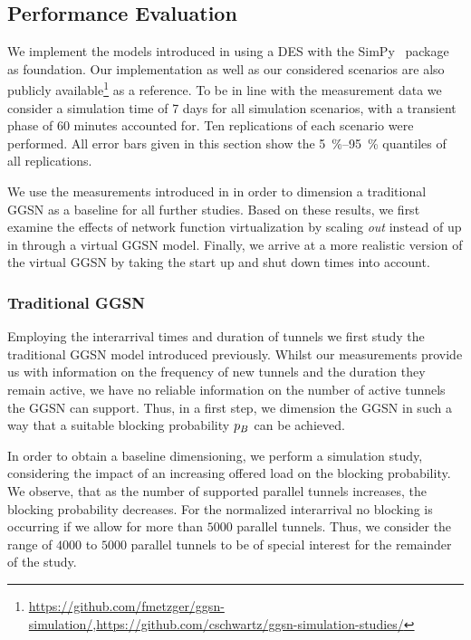 \subsection{Performance Evaluation}\label{sec:cloud:virtualized_network_functions:performance_evaluation}

We implement the models introduced in  using a \gls{DES} with the SimPy~\cite{SimPy2015} package as foundation. Our implementation as well as our considered scenarios are also publicly available\footnote{\url{https://github.com/fmetzger/ggsn-simulation/},\url{https://github.com/cschwartz/ggsn-simulation-studies/}} as a reference.
To be in line with the measurement data we consider a simulation time of 7 days for all simulation scenarios, with a transient phase of 60 minutes accounted for.
Ten replications of each scenario were performed.
All error bars given in this section show the \SIrange{5}{95}{\percent} quantiles of all replications.

We use the measurements introduced in  in order to dimension a traditional \gls{GGSN} as a baseline for all further studies.
Based on these results, we first examine the effects of network function virtualization by scaling \emph{out} instead of up in through a virtual \gls{GGSN} model.
Finally, we arrive at a more realistic version of the virtual \gls{GGSN} by taking the start up and shut down times into account.

\subsubsection*{Traditional GGSN}\label{sec:cloud:virtualized_network_functions:performance_evaluation:traditional_ggsn}

Employing the interarrival times and duration of tunnels we first study the traditional \gls{GGSN} model introduced previously.
Whilst our measurements provide us with information on the frequency of new tunnels and the duration they remain active, we have no reliable information on the number of active tunnels the \gls{GGSN} can support.
Thus, in a first step, we dimension the \gls{GGSN} in such a way that a suitable blocking probability \(p_B\) can be achieved.


In order to obtain a baseline dimensioning, we perform a simulation study, considering the impact of an increasing offered load on the blocking probability.
We observe, that as the number of supported parallel tunnels increases, the blocking probability decreases.
For the normalized interarrival no blocking is occurring if we allow for more than \(5000\) parallel tunnels.
Thus, we consider the range of \(4000\) to \(5000\) parallel tunnels to be of special interest for the remainder of the study.


